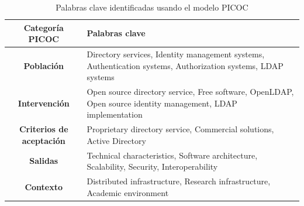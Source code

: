 \begin{table}[H]
	\centering
	\caption{Palabras clave identificadas usando el modelo PICOC}
	\label{tab:palabras-clave-picoc}

	\renewcommand{\arraystretch}{1.2}
	\fontsize{9pt}{10pt}\selectfont

	\begin{tabularx}{\textwidth}{|c|X|}
		\hline
		\textbf{Categoría PICOC}         &
		\textbf{Palabras clave}
		\\
		\hline
		\textbf{Población}               &
		Directory services, Identity management systems, Authentication systems, Authorization systems, LDAP systems
		\\
		\hline
		\textbf{Intervención}            &
		Open source directory service, Free software, OpenLDAP, Open source identity management, LDAP implementation
		\\
		\hline
		\textbf{Criterios de aceptación} &
		Proprietary directory service, Commercial solutions, Active Directory
		\\
		\hline
		\textbf{Salidas}                 &
		Technical characteristics, Software architecture, Scalability, Security, Interoperability
		\\
		\hline
		\textbf{Contexto}                &
		Distributed infrastructure, Research infrastructure, Academic environment
		\\
		\hline
	\end{tabularx}
\end{table}
